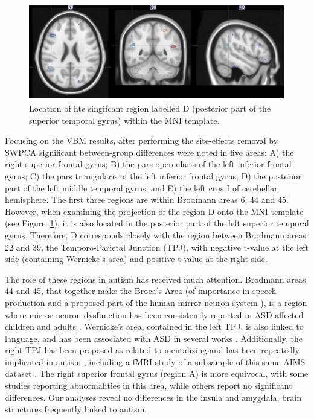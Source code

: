 \begin{figure}
\centering
\includegraphics[width=0.7\linewidth]{Graphics/ch7/FIGURE06}
\caption[Location of hte singifcant region labelled D (posterior part of the superior temporal gyrus) within the \acs{MNI} template.]{Location of hte singifcant region labelled D (posterior part of the superior temporal gyrus) within the \acs{MNI} template.}
\label{fig:figure06}
\end{figure}

Focusing on the \ac{VBM} results, after performing the site-effects removal by \ac{SWPCA} significant between-group differences were noted in five areas: A) the right superior frontal gyrus; B) the pars opercularis of the left inferior frontal gyrus; C) the pars triangularis of the left inferior frontal gyrus; D) the posterior part of the left middle temporal gyrus; and E) the left crus I of cerebellar hemisphere. The first three regions are within Brodmann areas 6, 44 and 45. However, when examining the projection of the region D onto the MNI template (see Figure~\ref{fig:figure06}), it is also located in the posterior part of the left superior temporal gyrus. Therefore, D corresponds closely with the region between Brodmann areas 22 and 39, the Temporo-Parietal Junction (TPJ), with negative t-value at the left side (containing Wernicke's area) and positive t-value at the right side. 

The role of these regions in autism has received much attention. Brodmann areas 44 and 45, that together make the Broca's Area (of importance in speech production and a proposed part of the human mirror neuron system \cite{Nishitani2005}), is a region where mirror neuron dysfunction has been consistently reported in \ac{ASD}-affected children \cite{Dapretto2006} and adults \cite{Hadjikhani2006,Lopez-Hurtado2008,Verly2014}. Wernicke's area, contained in the left TPJ, is also linked to language, and has been associated with \ac{ASD} in several works \cite{Hadjikhani2006,Verly2014}. Additionally, the right TPJ has been proposed as related to mentalizing and has been repeatedly implicated in autism \cite{Barnea-Goraly2004}, including a f\ac{MRI} study of a subsample of this same AIMS dataset \cite{Lombardo2011}. The right superior frontal gyrus (region A) is more equivocal, with some studies \cite{Ecker2010,Ecker2012} reporting abnormalities in this area, while others \cite{Hadjikhani2006,Segovia2014} report no significant differences. Our analyses reveal no differences in the insula and amygdala, brain structures frequently linked to autism. 

